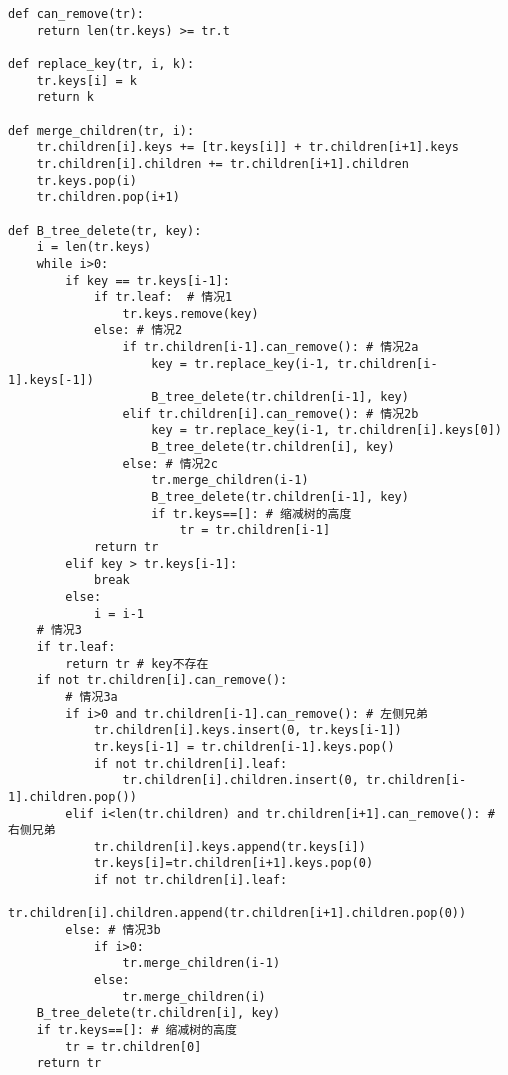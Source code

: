 \documentclass[UTF8]{article}
\begin{document}
\lstset{language=Python}
\begin{lstlisting}
def can_remove(tr):
    return len(tr.keys) >= tr.t

def replace_key(tr, i, k):
    tr.keys[i] = k
    return k

def merge_children(tr, i):
    tr.children[i].keys += [tr.keys[i]] + tr.children[i+1].keys
    tr.children[i].children += tr.children[i+1].children
    tr.keys.pop(i)
    tr.children.pop(i+1)

def B_tree_delete(tr, key):
    i = len(tr.keys)
    while i>0:
        if key == tr.keys[i-1]:
            if tr.leaf:  # 情况1
                tr.keys.remove(key)
            else: # 情况2
                if tr.children[i-1].can_remove(): # 情况2a
                    key = tr.replace_key(i-1, tr.children[i-1].keys[-1])
                    B_tree_delete(tr.children[i-1], key)
                elif tr.children[i].can_remove(): # 情况2b
                    key = tr.replace_key(i-1, tr.children[i].keys[0])
                    B_tree_delete(tr.children[i], key)
                else: # 情况2c
                    tr.merge_children(i-1)
                    B_tree_delete(tr.children[i-1], key)
                    if tr.keys==[]: # 缩减树的高度
                        tr = tr.children[i-1]
            return tr
        elif key > tr.keys[i-1]:
            break
        else:
            i = i-1
    # 情况3
    if tr.leaf:
        return tr # key不存在
    if not tr.children[i].can_remove():
        # 情况3a
        if i>0 and tr.children[i-1].can_remove(): # 左侧兄弟
            tr.children[i].keys.insert(0, tr.keys[i-1])
            tr.keys[i-1] = tr.children[i-1].keys.pop()
            if not tr.children[i].leaf:
                tr.children[i].children.insert(0, tr.children[i-1].children.pop())
        elif i<len(tr.children) and tr.children[i+1].can_remove(): # 右侧兄弟
            tr.children[i].keys.append(tr.keys[i])
            tr.keys[i]=tr.children[i+1].keys.pop(0)
            if not tr.children[i].leaf:
                tr.children[i].children.append(tr.children[i+1].children.pop(0))
        else: # 情况3b
            if i>0:
                tr.merge_children(i-1)
            else:
                tr.merge_children(i)
    B_tree_delete(tr.children[i], key)
    if tr.keys==[]: # 缩减树的高度
        tr = tr.children[0]
    return tr
\end{lstlisting}

\end{document}
